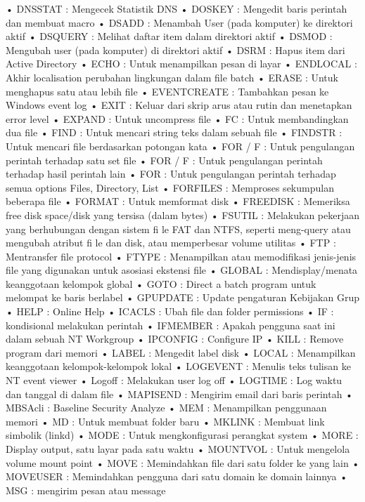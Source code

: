 \documentclass{article}
\begin{document}
• DNSSTAT : Mengecek Statistik DNS
• DOSKEY : Mengedit baris perintah dan membuat macro
• DSADD : Menambah User (pada komputer) ke direktori aktif
• DSQUERY : Melihat daftar item dalam direktori aktif
• DSMOD : Mengubah user (pada komputer) di direktori aktif
• DSRM : Hapus item dari Active Directory
• ECHO : Untuk menampilkan pesan di layar
• ENDLOCAL : Akhir localisation  perubahan lingkungan dalam file batch
• ERASE : Untuk menghapus satu atau lebih file
• EVENTCREATE : Tambahkan pesan ke Windows event log
• EXIT : Keluar dari skrip arus atau rutin dan menetapkan error level
• EXPAND : Untuk uncompress file
• FC : Untuk membandingkan dua file
• FIND : Untuk mencari string teks dalam sebuah file
• FINDSTR : Untuk mencari file berdasarkan potongan kata
• FOR / F : Untuk pengulangan perintah terhadap satu set file
• FOR / F : Untuk pengulangan perintah terhadap hasil perintah lain
• FOR : Untuk pengulangan perintah terhadap semua options Files, Directory, List
• FORFILES : Memproses sekumpulan beberapa file
• FORMAT : Untuk memformat disk
• FREEDISK : Memeriksa free disk space/disk yang tersisa (dalam bytes)
• FSUTIL :  Melakukan pekerjaan yang berhubungan dengan sistem fi le FAT dan NTFS, seperti meng-query atau mengubah atribut fi le dan disk, atau memperbesar  volume utilitas
• FTP : Mentransfer file  protocol
• FTYPE : Menampilkan atau memodifikasi jenis-jenis file yang digunakan untuk  asosiasi ekstensi file
• GLOBAL : Mendisplay/menata keanggotaan kelompok global
• GOTO : Direct a batch program untuk melompat ke baris berlabel
• GPUPDATE : Update pengaturan Kebijakan Grup
• HELP : Online Help
• ICACLS : Ubah file dan folder permissions
• IF : kondisional melakukan perintah
• IFMEMBER : Apakah pengguna saat ini dalam sebuah NT Workgroup
• IPCONFIG : Configure IP
• KILL : Remove program dari memori
• LABEL : Mengedit label disk
• LOCAL : Menampilkan keanggotaan kelompok-kelompok lokal
• LOGEVENT : Menulis teks tulisan ke NT event viewer
• Logoff : Melakukan user log off
• LOGTIME : Log waktu dan tanggal di dalam file
• MAPISEND : Mengirim email dari baris perintah
• MBSAcli : Baseline Security Analyze
• MEM : Menampilkan penggunaan memori 
• MD : Untuk membuat folder baru
• MKLINK : Membuat link simbolik (linkd) 
• MODE : Untuk mengkonfigurasi perangkat system
• MORE : Display output, satu layar pada satu waktu 
• MOUNTVOL : Untuk mengelola volume mount point 
• MOVE : Memindahkan file dari satu folder ke yang lain 
• MOVEUSER : Memindahkan pengguna dari satu domain ke domain lainnya 
• MSG : mengirim pesan atau message 
\end{document}
